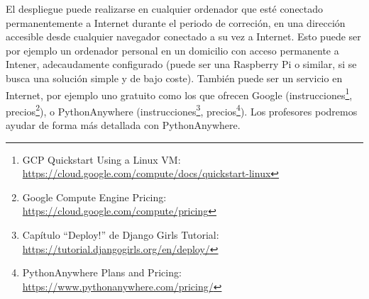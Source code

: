 \begin{itemize}
  El despliegue puede realizarse en cualquier ordenador que esté conectado permanentemente a Internet durante el periodo de correción, en una dirección accesible desde cualquier navegador conectado a su vez a Internet. Esto puede ser por ejemplo un ordenador personal en un domicilio con acceso permanente a Intener, adecaudamente configurado (puede ser una Raspberry Pi o similar, si se busca una solución simple y de bajo coste). También puede ser un servicio en Internet, por ejemplo uno gratuito como los que ofrecen Google (instrucciones\footnote{GCP Quickstart Using a Linux VM:\\ \url{https://cloud.google.com/compute/docs/quickstart-linux}}, precios\footnote{Google Compute Engine Pricing:\\ \url{https://cloud.google.com/compute/pricing}}), o PythonAnywhere (instrucciones\footnote{Capítulo ``Deploy!'' de Django Girls Tutorial:\\ \url{https://tutorial.djangogirls.org/en/deploy/}}, precios\footnote{PythonAnywhere Plans and Pricing:\\ \url{https://www.pythonanywhere.com/pricing/}}). Los profesores podremos ayudar de forma más detallada con PythonAnywhere.

\end{itemize}
